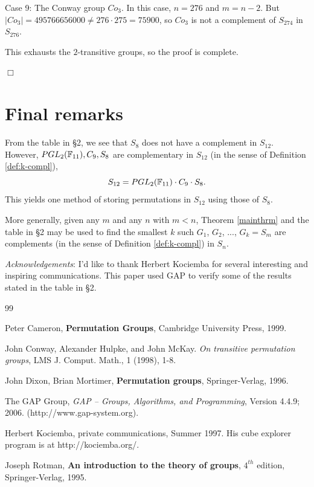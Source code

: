 Case 9: The Conway group $Co_3$. In this case, 
$n=276$ and $m=n-2$. But
$|Co_3|=495766656000\not= 276\cdot 275=  75900$, so $Co_3$ is not 
a complement of $S_{274}$ in $S_{276}$. 

This exhausts the $2$-transitive groups, so the proof is complete.

$\Box$

\section{Final remarks}

From the table in \S 2, we see that $S_8$ does not have a complement in 
$S_{12}$. However, $PGL_2({{\Bbb F}}_{11}), C_9, S_8$ are complementary
in $S_{12}$ (in the sense of Definition \ref{def:k-compl}),
\[
S_{12}=PGL_2({{\Bbb F}}_{11})\cdot C_9\cdot S_8.
\]
This yields one method of storing permutations in $S_{12}$
using those of $S_8$.

More generally, given any $m$ and any $n$ with $m<n$, Theorem \ref{mainthrm}
and the table in \S 2 may be used to find the smallest $k$ such
$G_1$, $G_2$, ..., $G_k=S_m$ are complements (in the sense of Definition
\ref{def:k-compl}) in $S_n$.

{\it Acknowledgements}: I'd like to thank Herbert Kociemba for 
several interesting and inspiring communications. This paper
used GAP \cite{GAP} to verify some of the results stated in
the table in \S 2.


\begin{thebibliography}{99}

Peter Cameron, {\bf Permutation Groups}, 
Cambridge University Press, 1999.

John Conway, Alexander Hulpke, and John McKay.
{\it On transitive permutation groups},
LMS J. Comput. Math., 1 (1998), 1-8.

 John Dixon, Brian Mortimer, 
{\bf Permutation groups}, Springer-Verlag, 1996.

 The GAP Group, 
{\it GAP -- Groups, Algorithms, and Programming}, 
Version 4.4.9; 2006. (http://www.gap-system.org).

 Herbert Kociemba, private communications, 
Summer 1997. His cube explorer program is at
http://kociemba.org/.

 Joseph Rotman, 
{\bf An introduction to the theory of groups}, 
$4^{th}$ edition, Springer-Verlag, 1995.

\end{thebibliography}

